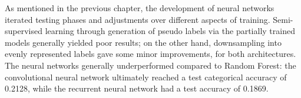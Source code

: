 

As mentioned in the previous chapter, the development of neural networks
iterated testing phases and adjustments over different aspects of training.
Semi-supervised learning through generation of pseudo labels via the partially
trained models generally yielded poor results; on the other hand, downsampling
into evenly represented labels gave some minor improvements, for both architectures.
The neural networks generally underperformed compared to Random Forest:
the convolutional neural network ultimately reached a test categorical accuracy
of 0.2128, while the recurrent neural network had a test accuracy of 0.1869.\\

